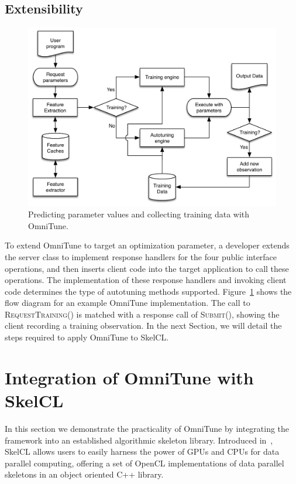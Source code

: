 \documentclass[nonatbib,preprint,nocopyrightspace,9pt]{sigplanconf}
\begin{document}
\subsection{Extensibility}

\begin{figure}
\centering
\includegraphics[width=\columnwidth]{img/omnitune-system-flow.pdf}
\caption[Optimization parameter selection with OmniTune]{%
  Predicting parameter values and collecting training data with
  OmniTune.%
}
\label{fig:omnitune-system-flow}
\end{figure}

To extend OmniTune to target an optimization parameter, a developer
extends the server class to implement response handlers for the four
public interface operations, and then inserts client code into the
target application to call these operations. The implementation of
these response handlers and invoking client code determines the type
of autotuning methods supported. Figure~\ref{fig:omnitune-system-flow}
shows the flow diagram for an example OmniTune implementation. The
call to \textsc{RequestTraining()} is matched with a response call of
\textsc{Submit()}, showing the client recording a training
observation. In the next Section, we will detail the steps required to
apply OmniTune to SkelCL.


\section{Integration of OmniTune with SkelCL}\label{sec:omnitune-skelcl}

In this section we demonstrate the practicality of OmniTune by
integrating the framework into an established algorithmic skeleton
library. Introduced in~\cite{Steuwer2011}, SkelCL allows users to
easily harness the power of GPUs and CPUs for data parallel computing,
offering a set of OpenCL implementations of data parallel skeletons in
an object oriented C++ library.
\end{document}

